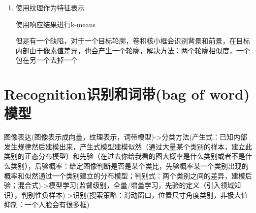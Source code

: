 \documentclass[UTF8]{ctexart}
\begin{document}
\begin{itemize}
\begin{enumerate}
\begin{itemize}
            切除图中的边，边的权重和最小
            这种图割方法会切除很多很细小的独立区域
            \item normalized cut归一化图割
            
            公式：$\frac{w(A,B)}{w(A,V)}+\frac{w(A,B)}{w(B,V)}$
            w(A,B)是切割的两个部分A和B，A中像素点和B中像素点的连接边权重之和且让其最小，V是除了A像素图中的其他像素。若A只切割成一个像素，那么分母将会很小，归一化图割的数值会变大，所以能避免把图中像素切割出独立像素的情况。

            公式：$\frac{y^T(D-W)y}{y^TDy}$
            这个公式我们求$y^T$，$y^T$是每一个像素对应第几个类别。W是相似度邻接矩阵，定义$\sigma$，求两个像素之间的距离填入相似度邻接矩阵。D是对角矩阵，D11是W第1行数值之和。

            如何求解：拉格朗日乘子法
            分子A，分母B，最小化L=A-$\lambda$B,求导=0，第一小的特征值是0，选择第二小的特征值对应的特征向量。
            求出的y需要设置门限，来决定类别。

            多类分割：迭代/kmeans
        \end{itemize}
        \item 使用纹理作为特征表示
        
        使用响应结果进行k-means

        但是有一个缺陷，对于一个目标轮廓，卷积核小框会识别背景和前景，在目标内部由于像素值差异，也会产生一个轮廓，解决方法：两个轮廓相似度，一个包在另一个去掉一个
    \end{enumerate}

\end{itemize}

\section{Recognition识别和词带(bag of word)模型}

图像表达(图像表示成向量，纹理表示，词带模型)->分类方法(产生式：已知内部发生规律然后建模出来，产生式模型建模似然（通过大量某个类别的样本，建立此类别的正态分布模型）和先验（在过去你给我看的图大概率是什么类别或者不是什么类别），后验概率：给定图像判断是否是某个类比，先验概率某一个类别出现的概率和似然通过一个类别建立的分布模型；判别式：两个类别之间的差异，建模后验；混合式)->模型学习(监督级别，全量/增量学习，先验的定义（引入领域知识），判别性负样本)->识别(搜索策略：滑动窗口，位置尺寸角度类别，非极大值抑制：一个人脸会有很多框)
\end{document}
